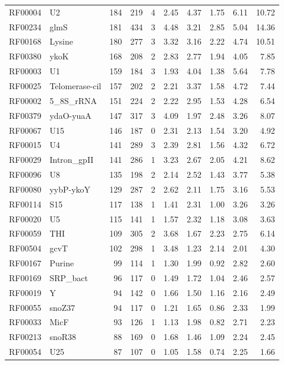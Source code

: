 \begin{table}
\begin{center}
\begin{tabular}{|ll|rrr|rr|rr|r|}
RF00004 & U2 & 184 & 219 & 4 & 2.45 & 4.37 & 1.75 & 6.11 & 10.72 \\  
RF00234 & glmS & 181 & 434 & 3 & 4.48 & 3.21 & 2.85 & 5.04 & 14.36 \\  
RF00168 & Lysine & 180 & 277 & 3 & 3.32 & 3.16 & 2.22 & 4.74 & 10.51 \\  
RF00380 & ykoK & 168 & 208 & 2 & 2.83 & 2.77 & 1.94 & 4.05 & 7.85 \\  
RF00003 & U1 & 159 & 184 & 3 & 1.93 & 4.04 & 1.38 & 5.64 & 7.78 \\  
RF00025 & Telomerase-cil & 157 & 202 & 2 & 2.21 & 3.37 & 1.58 & 4.72 & 7.44 \\  
RF00002 & 5\_8S\_rRNA & 151 & 224 & 2 & 2.22 & 2.95 & 1.53 & 4.28 & 6.54 \\  
RF00379 & ydaO-yuaA & 147 & 317 & 3 & 4.09 & 1.97 & 2.48 & 3.26 & 8.07 \\  
RF00067 & U15 & 146 & 187 & 0 & 2.31 & 2.13 & 1.54 & 3.20 & 4.92 \\  
RF00015 & U4 & 141 & 289 & 3 & 2.39 & 2.81 & 1.56 & 4.32 & 6.72 \\  
RF00029 & Intron\_gpII & 141 & 286 & 1 & 3.23 & 2.67 & 2.05 & 4.21 & 8.62 \\  
RF00096 & U8 & 135 & 198 & 2 & 2.14 & 2.52 & 1.43 & 3.77 & 5.38 \\  
RF00080 & yybP-ykoY & 129 & 287 & 2 & 2.62 & 2.11 & 1.75 & 3.16 & 5.53 \\  
RF00114 & S15 & 117 & 138 & 1 & 1.41 & 2.31 & 1.00 & 3.26 & 3.26 \\  
RF00020 & U5 & 115 & 141 & 1 & 1.57 & 2.32 & 1.18 & 3.08 & 3.63 \\  
RF00059 & THI & 109 & 305 & 2 & 3.68 & 1.67 & 2.23 & 2.75 & 6.14 \\  
RF00504 & gcvT & 102 & 298 & 1 & 3.48 & 1.23 & 2.14 & 2.01 & 4.30 \\  
RF00167 & Purine & 99 & 114 & 1 & 1.30 & 1.99 & 0.92 & 2.82 & 2.60 \\  
RF00169 & SRP\_bact & 96 & 117 & 0 & 1.49 & 1.72 & 1.04 & 2.46 & 2.57 \\  
RF00019 & Y & 94 & 142 & 0 & 1.66 & 1.50 & 1.16 & 2.16 & 2.49 \\  
RF00055 & snoZ37 & 94 & 117 & 0 & 1.21 & 1.65 & 0.86 & 2.33 & 1.99 \\  
RF00033 & MicF & 93 & 126 & 1 & 1.13 & 1.98 & 0.82 & 2.71 & 2.23 \\  
RF00213 & snoR38 & 88 & 169 & 0 & 1.68 & 1.46 & 1.09 & 2.24 & 2.45 \\  
RF00054 & U25 & 87 & 107 & 0 & 1.05 & 1.58 & 0.74 & 2.25 & 1.66 \\  

\end{tabular}
\end{center}
\end{table}

